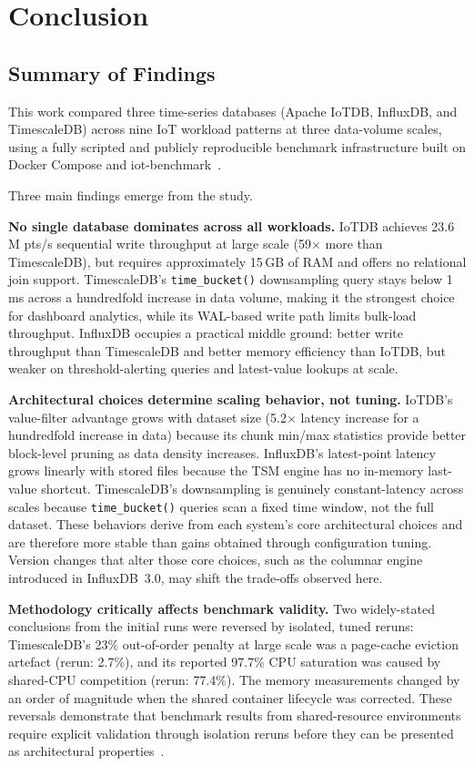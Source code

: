 \section{Conclusion}
\label{sec:conclusion}

\subsection{Summary of Findings}

This work compared three time-series databases (Apache IoTDB, InfluxDB, and TimescaleDB)
across nine IoT workload patterns at three data-volume scales, using a fully scripted
and publicly reproducible benchmark infrastructure built on Docker Compose and
iot-benchmark~\cite{iotbenchmark}.

Three main findings emerge from the study.

\textbf{No single database dominates across all workloads.} IoTDB achieves 23.6\,M pts/s
sequential write throughput at large scale (59$\times$ more than TimescaleDB), but
requires approximately 15\,GB of RAM and offers no relational join support.
TimescaleDB's \texttt{time\_bucket()} downsampling query stays below 1\,ms across a hundredfold
increase in data volume, making it the strongest choice for dashboard analytics, while its WAL-based
write path limits bulk-load throughput. InfluxDB occupies a practical middle ground:
better write throughput than TimescaleDB and better memory efficiency than IoTDB, but
weaker on threshold-alerting queries and latest-value lookups at scale.

\textbf{Architectural choices determine scaling behavior, not tuning.}
IoTDB's value-filter advantage grows with dataset size (5.2$\times$ latency increase for
a hundredfold increase in data) because its chunk min/max statistics provide better block-level
pruning as data density increases. InfluxDB's latest-point latency grows linearly with
stored files because the TSM engine has no in-memory last-value shortcut. TimescaleDB's
downsampling is genuinely constant-latency across scales because \texttt{time\_bucket()}
queries scan a fixed time window, not the full dataset. These behaviors derive from each system's core architectural choices and are therefore
more stable than gains obtained through configuration tuning. Version changes that alter
those core choices, such as the columnar engine introduced in InfluxDB~3.0, may shift
the trade-offs observed here.

\textbf{Methodology critically affects benchmark validity.}
Two widely-stated conclusions from the initial runs were reversed by isolated, tuned reruns:
TimescaleDB's 23\% out-of-order penalty at large scale was a page-cache eviction artefact
(rerun: 2.7\%), and its reported 97.7\% CPU saturation was caused by shared-CPU competition
(rerun: 77.4\%). The memory measurements changed by an order of magnitude when the shared
container lifecycle was corrected. These reversals demonstrate that benchmark results from
shared-resource environments require explicit validation through isolation reruns before
they can be presented as architectural properties~\citep{shapira2016pitfalls}.

